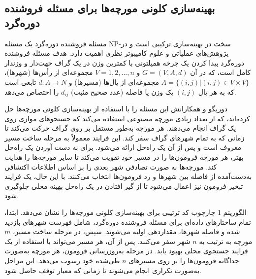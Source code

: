 \documentclass[a4paper,10pt]{article}
\begin{document}
        \subsection{بهینه‌سازی کلونی مورچه‌ها برای مسئله فروشنده دوره‌گرد}

            مسئله فروشنده دوره‌گرد یک مسئله NP-سخت در بهینه‌سازی ترکیبی است و در پژوهش‌های عملیاتی و علوم کامپیوتر نظری اهمیت دارد. هدف مسئله فروشنده دوره‌گرد پیدا کردن یک چرخه همیلتونی با کمترین وزن در یک گراف جهت‌دار و وزندار کامل است، که در آن $G=(V,A,d)$ و $V=1,2,...,n$ مجموعه‌ای از رأس‌ها (شهرها)، $A=\{(i,j)|(i,j)\in V\times V\}$ مجموعه‌ای از یال‌ها (مسیرها) و $d:A\rightarrow N$ تابعی است که به هر یال $(i, j)$ یک وزن یا فاصله (عدد صحیح مثبت) $d_{ij}$ را اختصاص می‌دهد.

            دوریگو و همکارانش این مسئله را با استفاده از بهینه‌سازی کلونی مورچه‌ها حل کرده‌اند، که از تعداد زیادی مورچه مصنوعی استفاده می‌کند که جستجوهای موازی روی یک گراف انجام می‌دهند. هر مورچه به‌طور مستقل بر روی گراف حرکت می‌کند تا زمانی که به تمام شهرهای گراف سفر کند. این فرایند معمولاً به مرحله ساخت مسیر معروف است و پس از آن یک راه‌حل ارائه می‌شود. برای به دست آوردن یک راه‌حل بهتر، هر مورچه فرومون‌ها را در مسیر خود تقویت می‌کند تا سایر مورچه‌ها را هدایت کند. مورچه‌ها به صورت تصادفی شهر بعدی را بر اساس اطلاعات اکتشافی به‌دست‌آمده از فاصله بین شهرها و رد فرومون‌ها انتخاب می‌کنند. با این حال، یک فرایند تبخیر فرومون نیز اعمال می‌شود تا از گیر افتادن در یک راه‌حل بهینه محلی جلوگیری شود.

            الگوریتم 1 چارچوب کد ترتیبی برای بهینه‌سازی کلونی مورچه‌ها را نشان می‌دهد. ابتدا، تمام ساختارهای داده‌ای برای مسئله فروشنده دوره‌گرد، شامل فهرست شهرهای بازدید شده و فاصله شهرها، مقداردهی اولیه می‌شوند. سپس، در مرحله ساخت مسیر، $m$ مورچه به ترتیب به $n$ شهر سفر می‌کنند. پس از آن، هر مسیر می‌تواند با استفاده از یک فرایند جستجوی محلی بهبود یابد. در مرحله به‌روزرسانی فرومون، هر مورچه به‌صورت جداگانه فرومون‌ها را بر روی مسیرهای $n$ طی‌شده خود رسوب می‌دهد. این مراحل به‌صورت تکراری انجام می‌شوند تا زمانی که معیار توقف حاصل شود.

            
\end{document}
